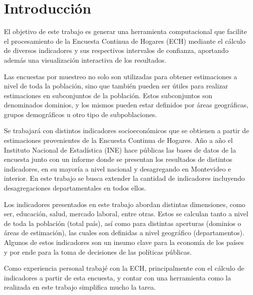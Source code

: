 \documentclass[12pt,twoside,spanish,a4paper]{book}\usepackage[]{graphicx}\usepackage[]{color}
\begin{document}

\listoffigures
\listoftables


\setcounter{page}{1} 
 

\chapter{Introducción \label{cap:Intro}}

El objetivo de este trabajo es generar una herramienta computacional que facilite el procesamiento de la Encuesta Continua de Hogares (ECH) mediante el cálculo de diversos indicadores y sus respectivos intervalos de confianza, aportando además una visualización interactiva de los resultados.

Las encuestas por muestreo no solo son utilizadas para obtener estimaciones a nivel de toda la población, sino que también pueden ser útiles para realizar estimaciones en subconjuntos de la población. Estos subconjuntos son denominados dominios, y los mismos pueden estar definidos por áreas geográficas, grupos demográficos u otro tipo de subpoblaciones.

Se trabajará con distintos indicadores socioeconómicos que se obtienen a partir de estimaciones provenientes de la Encuesta Continua de Hogares. Año a año el Instituto Nacional de Estadística (INE) hace públicas las bases de datos de la encuesta junto con un informe donde se presentan los resultados de distintos indicadores, en su mayoría a nivel nacional y desagregando en Montevideo e interior. En este trabajo se busca extender la cantidad de indicadores incluyendo desagregaciones departamentales en todos ellos.

Los indicadores presentados en este trabajo abordan distintas dimensiones, como ser, educación, salud, mercado laboral, entre otras. Estos se calculan tanto a nivel de toda la población (total país), así como para distintas aperturas (dominios o áreas de estimación), las cuales son definidas a nivel geográfico (departamentos). Algunos de estos indicadores son un insumo clave para la economía de los países y por ende para la toma de decisiones de las políticas públicas.

Como experiencia personal trabajé con la ECH, principalmente con el cálculo de indicadores a partir de esta encuesta, y contar con una herramienta como la realizada en este trabajo simplifica mucho la tarea. 
\end{document}
